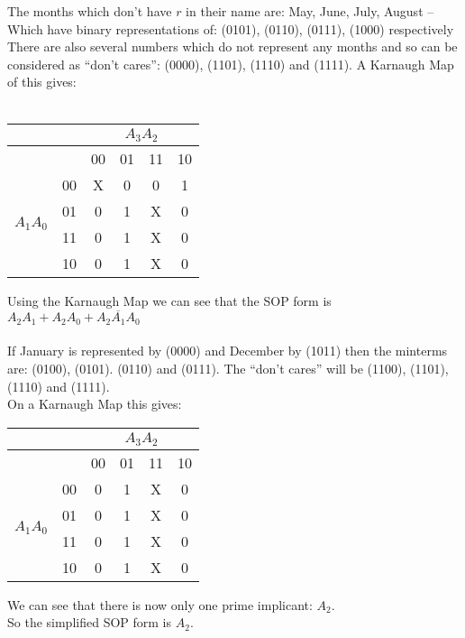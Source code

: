 \documentclass[10pt,\jkfside,a4paper]{article}
\begin{document}
\begin{enumerate}
The months which don't have $r$ in their name are:
May, June, July, August --
Which have binary representations of:
(0101), (0110), (0111), (1000) respectively \\
There are also several numbers which do not represent any months and so can be considered as ``don't cares'': (0000), (1101), (1110) and (1111).
A Karnaugh Map of this gives: \\\\
\begin{center}
\begin{tabular}{|c|c|c|c|c|c|} 
\hline
& & \multicolumn{4}{|c|}{$A_3A_2$} \\
\hline
& & 00 & 01 & 11 & 10 \\ 
\hline
\multirow{4}{2em}{$A_1A_0$} 
& 00 & X & 0 & 0 & 1 \\
& 01 & 0 & 1 & X & 0 \\
& 11 & 0 & 1 & X & 0 \\
& 10 & 0 & 1 & X & 0 \\
\hline
\end{tabular}
\end{center}
Using the Karnaugh Map we can see that the SOP form is $A_2A_1 + A_2A_0 + \overline{A_2A_1A_0}$
\\\\
If January is represented by (0000) and December by (1011) then the minterms are: (0100), (0101). (0110) and (0111). The ``don't cares'' will be (1100), (1101), (1110) and (1111).\\
On a Karnaugh Map this gives:
\begin{center}
\begin{tabular}{|c|c|c|c|c|c|} 
\hline
& & \multicolumn{4}{|c|}{$A_3A_2$} \\
\hline
& & 00 & 01 & 11 & 10 \\ 
\hline
\multirow{4}{2em}{$A_1A_0$} 
& 00 & 0 & 1 & X & 0 \\
& 01 & 0 & 1 & X & 0 \\
& 11 & 0 & 1 & X & 0 \\
& 10 & 0 & 1 & X & 0 \\
\hline
\end{tabular}
\end{center}
We can see that there is now only one prime implicant: $A_2$.\\
So the simplified SOP form is $A_2$.


\end{enumerate}
\end{document}
